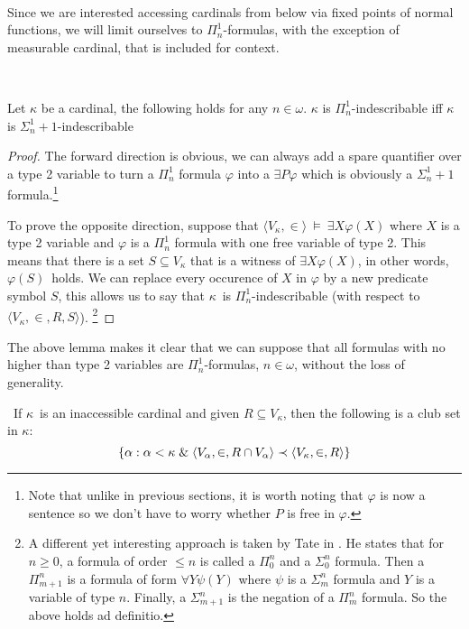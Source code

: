 \

Since we are interested accessing cardinals from below via fixed points of normal functions, we will limit ourselves to $\Pi^1_n$-formulas, with the exception of measurable cardinal, that is included for context.

\

\begin{lemma}
Let $\kappa$ be a cardinal, the following holds for any $n \in \omega$. $\kappa$ is $\Pi^1_n$-indescribable iff $\kappa$ is $\Sigma^1_n+1$-indescribable
\end{lemma}

\begin{proof}
The forward direction is obvious, we can always add a spare quantifier over a type 2 variable to turn a $\Pi^1_n$ formula $\varphi$ into a $\exists P \varphi$ which is obviously a $\Sigma^1_n+1$ formula.\footnote{Note that unlike in previous sections, it is worth noting that $\varphi$ is now a sentence so we don't have to worry whether $P$ is free in $\varphi$.}

To prove the opposite direction, suppose that $\langle V_\kappa, \in \rangle~\models~\exists X \varphi(X)$ where $X$ is a type 2 variable and $\varphi$ is a $\Pi^1_n$ formula with one free variable of type 2. This means that there is a set $S \subseteq V_\kappa$ that is a witness of $\exists X \varphi(X)$, in other words, $\varphi(S)$ holds. We can replace every occurence of $X$ in $\varphi$ by a new predicate symbol $S$, this allows us to say that $\kappa$ is $\Pi^1_n$-indescribable (with respect to $\langle V_\kappa, \in, R, S \rangle$).
\footnote{A different yet interesting approach is taken by Tate in \cite{Tait_constructingcardinals}. He states that for $n\geq 0$, a formula of order $\leq n$ is called a $\Pi^n_0$ and a $\Sigma^n_0$ formula. Then a $\Pi^n_{m+1}$ is a formula of form $\forall Y \psi(Y)$ where $\psi$ is a $\Sigma^n_m$ formula and $Y$ is a variable of type $n$. Finally, a $\Sigma^n_{m+1}$ is the negation of a $\Pi^n_m$ formula. So the above holds ad definitio.}
\end{proof}

The above lemma makes it clear that we can suppose that all formulas with no higher than type 2 variables are $\Pi^1_n$-formulas, $n \in \omega$, without the loss of generality.

\begin{lemma}\label{lemma:inaccessible_clubset}\
If $\kappa$ is an inaccessible cardinal and given $R \subseteq V_\kappa$, then the following is a club set in $\kappa$:
\begin{equation}
\{\alpha : \alpha < \kappa \mathrel{\&} \langle V_\alpha, \in, R \cap V_\alpha \rangle \prec \langle V_\kappa, \in, R \rangle \}\label{eq:inacc_lemma_set}
\end{equation}
\end{lemma}

